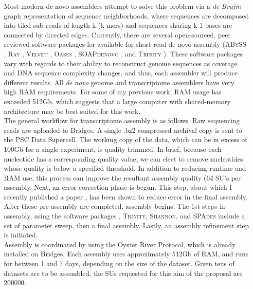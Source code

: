 \documentclass[10.5pt]{article}
\begin{document}
{\noindent
Most modern de novo assemblers attempt to solve this problem via a \textit{de Brujin} graph representation of sequence neighborhoods, where sequences are decomposed into tiled sub-reads of length k (k-mers) and sequences sharing k-1 bases are connected by directed edges.  Currently, there are several open-sourced, peer reviewed software packages for available for short read de novo assembly (\textsc{ABySS} \citep{Birol:2009ia,Simpson:2009iv}, \textsc{Ray} \citep{Boisvert:2010dz}, \textsc{Velvet} \citep{Zerbino:2008bm}, \textsc{Oases} \citep{Schulz:2012je}, \textsc{SOAPdenovo} \citep{Li:2009cx},  and \textsc{Trinity} \citep{Haas:jq,Grabherr:2011jb}).  These software packages vary with regards to their ability to reconstruct genome sequences as coverage and DNA sequence complexity changes, and thus, each assembler will produce different results.  All \textit{de novo} genome and transcriptome assemblers have very high RAM requirements. For some of my previous work, RAM usage has exceeded 512Gb, which suggests that a large computer with shared-memory architecture may be best suited for this work.   \\

\noindent
The general workflow for transcriptome assembly is as follows. Raw sequencing reads are uploaded to Bridges.  A single .bz2 compressed archival copy is sent to the PSC Data Supercell. The working copy of the data, which can be in excess of 100Gb for a single experiment, is quality trimmed. In brief, because each nucleotide has a corresponding quality value, we can elect to remove nucleotides whose quality is below a specified threshold. In addition to reducing runtime and RAM use, this process can improve the resultant assembly quality (64 SU's per assembly. Next, an error correction phase is begun.  This step, about which I recently published a paper \citep{MacManes:2013ec}, has been shown to reduce error in the final assembly.  \\

\noindent
After these pre-assembly are completed, assembly begins. The 1st steps in assembly, using the software packages , \textsc{Trinity}, \textsc{Shannon}, and \textsc{SPAdes} include a set of parameter sweep, then a final assembly. Lastly, an assembly refinement step is initiated.   \\

\noindent
Assembly is coordinated by using the Oyster River Protocol, which is already installed on Bridges. Each assembly uses approximately 512Gb of RAM, and runs for between 1 and 7 days, depending on the size of the dataset. Given tens of datasets are to be assembled, the SUs requested for this aim of the proposal are 200000.  

}
\end{document}
